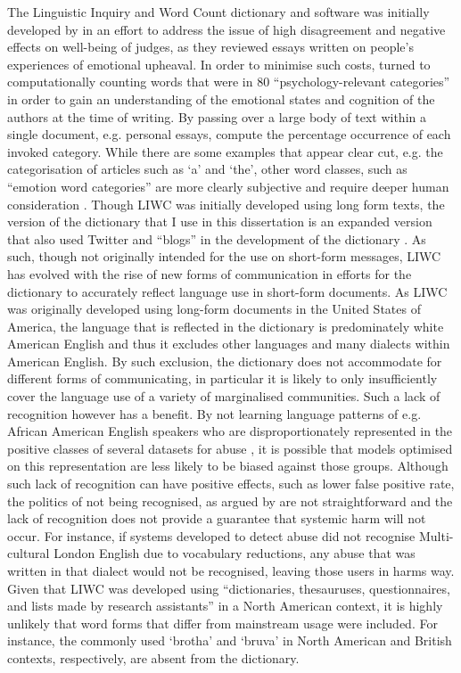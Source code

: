 The Linguistic Inquiry and Word Count dictionary and software was initially developed by \citet{Pennebaker:2001} in an effort to address the issue of high disagreement and negative effects on well-being of judges, as they reviewed essays written on people's experiences of emotional upheaval. 
In order to minimise such costs, \citet{Pennebaker:2001} turned to computationally counting words that were in $80$ ``psychology-relevant categories'' in order to gain an understanding of the emotional states and cognition of the authors at the time of writing. 
By passing over a large body of text within a single document, e.g. personal essays, \citet{Pennebaker:2001} compute the percentage occurrence of each invoked category. 
While there are some examples that appear clear cut, e.g. the categorisation of articles such as `a' and `the', other word classes, such as ``emotion word categories'' are more clearly subjective and require deeper human consideration \citep{Tausczik:2010}.
Though LIWC was initially developed using long form texts, the version of the dictionary that I use in this dissertation is an expanded version that also used Twitter and ``blogs'' in the development of the dictionary \citep{Pennebaker:2015}.
As such, though not originally intended for the use on short-form messages, LIWC has evolved with the rise of new forms of communication in efforts for the dictionary to accurately reflect language use in short-form documents.
As LIWC was originally developed using long-form documents in the United States of America, the language that is reflected in the dictionary is predominately white American English and thus it excludes other languages and many dialects within American English.
By such exclusion, the dictionary does not accommodate for different forms of communicating, in particular it is likely to only insufficiently cover the language use of a variety of marginalised communities. 
Such a lack of recognition however has a benefit. 
By not learning language patterns of e.g. African American English speakers who are disproportionately represented in the positive classes of several datasets for abuse \citep{Waseem:2018,Davidson:2019}, it is possible that models optimised on this representation are less likely to be biased against those groups. 
Although such lack of recognition can have positive effects, such as lower false positive rate, the politics of not being recognised, as argued by \citet{Benjamin:2019} are not straightforward and the lack of recognition does not provide a guarantee that systemic harm will not occur. 
For instance, if systems developed to detect abuse did not recognise Multi-cultural London English due to vocabulary reductions, any abuse that was written in that dialect would not be recognised, leaving those users in harms way.
Given that LIWC was developed using ``dictionaries, thesauruses, questionnaires, and lists made by research assistants'' \citep{Tausczik:2010} in a North American context, it is highly unlikely that word forms that differ from mainstream usage were included. 
For instance, the commonly used `brotha' and `bruva' in North American and British contexts, respectively, are absent from the dictionary.
\vspace{5mm}

